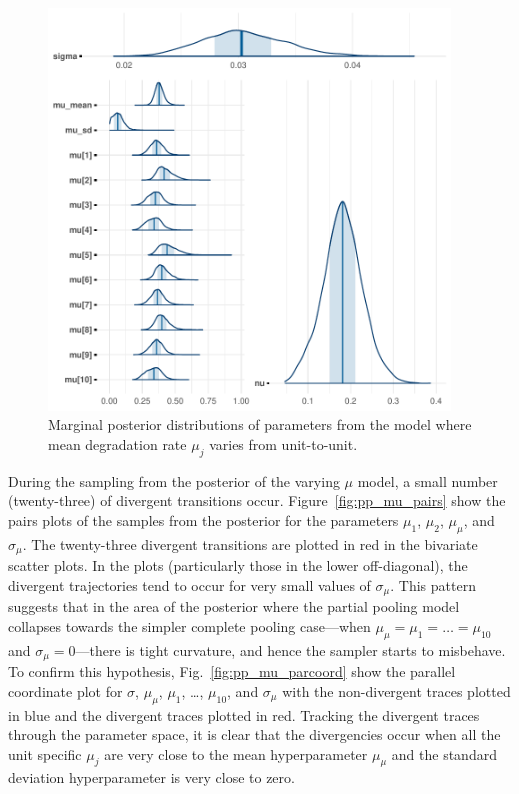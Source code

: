 \begin{figure}
   \centering
   \includegraphics[width=0.95\textwidth]{./figures/ch-5/plot-pp-mu-marg-post-1.pdf}
   \caption{Marginal posterior distributions of parameters from the model where mean degradation rate $\mu_j$ varies from unit-to-unit.}
   \label{fig:pp_mu_marg} 
\end{figure}

During the sampling from the posterior of the varying $\mu$ model, a small number (twenty-three) of divergent transitions occur. Figure~\ref{fig:pp_mu_pairs} show the pairs plots of the samples from the posterior for the parameters $\mu_1$, $\mu_2$, $\mu_\mu$, and $\sigma_\mu$. The twenty-three divergent transitions are plotted in red in the bivariate scatter plots. In the plots (particularly those in the lower off-diagonal), the divergent trajectories tend to occur for very small values of $\sigma_\mu$. This pattern suggests that in the area of the posterior where the partial pooling model collapses towards the simpler complete pooling case---when $\mu_\mu = \mu_1 = \ldots = \mu_{10}$ and $\sigma_\mu = 0$---there is tight curvature, and hence the sampler starts to misbehave. To confirm this hypothesis, Fig.~\ref{fig:pp_mu_parcoord} show the parallel coordinate plot for $\sigma$, $\mu_\mu$, $\mu_1$, \ldots, $\mu_{10}$, and $\sigma_\mu$ with the non-divergent traces plotted in blue and the divergent traces plotted in red. Tracking the divergent traces through the parameter space, it is clear that the divergencies occur when all the unit specific $\mu_j$ are very close to the mean hyperparameter $\mu_\mu$ and the standard deviation hyperparameter is very close to zero.

